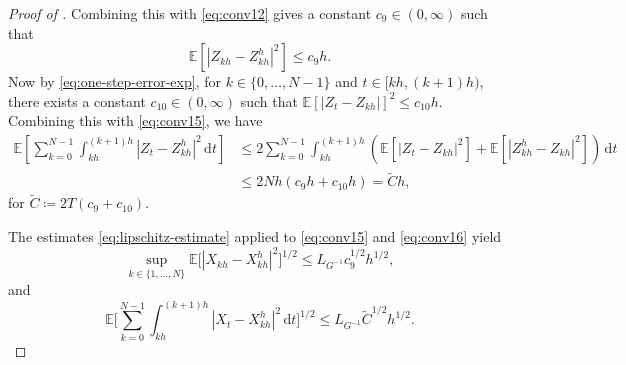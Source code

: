\documentclass[onseside, final]{amsart}
\theoremstyle{definition}
\newcommand{\E}{\mathbb E}
\newcommand{\D}{\,\mathrm{d}}
\numberwithin{equation}{section}
\begin{document}
\begin{proof}[Proof of ]
			Combining this with \eqref{eq:conv12} gives a constant $c_{9}\in(0,\infty)$ such that
			\begin{equation}\label{eq:conv15}
				\mathbb{E} [|Z_{kh}-Z^h_{kh}|^2]
				\le
				c_{9} h.
			\end{equation}
			Now by \eqref{eq:one-step-error-exp}, for $k \in \{0, \dotsc, N - 1\}$ and $t \in [kh, (k+1)h)$, there exists a constant $c_{10} \in (0, \infty)$ such that $\E[|Z_{t} - Z_{kh}|]^2 \leq c_{10}h$. Combining this with \eqref{eq:conv15}, we have
			\begin{equation}\label{eq:conv16}
				\begin{split}
					\E\!\left[\sum_{k = 0}^{N - 1} \int_{kh}^{(k+1)h}|Z_t - Z^h_{kh}|^2\D t\right]\! & \leq 2\sum_{k = 0}^{N - 1} \int_{kh}^{(k+1)h}\!\left(\E[|Z_t - Z_{kh}|^2] + \E[|Z^h_{kh} - Z_{kh}|^2]\right)\!\D t\\
					& \leq 2 N h (c_{9} h + c_{10} h) = \tilde C h,
				\end{split}
			\end{equation}
			for $\tilde C \coloneqq 2T(c_{9} + c_{10})$.
			
			The estimates \eqref{eq:lipschitz-estimate} applied to \eqref{eq:conv15} and \eqref{eq:conv16} yield
			\begin{equation}\label{eq:conv17}
				\sup_{k \in \{1, \dotsc, N\}}\mathbb{E}\bigl[|X_{kh}- X^h_{kh}|^{2}\bigr]^{1/2} \leq L_{G^{-1}} c_9^{1/2}h^{1/2},
			\end{equation}
			and
			\begin{equation}\label{eq:conv18}
				\E\Biggl[\sum_{k = 0}^{N - 1} \int_{kh}^{(k+1)h}|X_t - X^h_{kh}|^2\D t\Biggr]^{1/2} \leq L_{G^{-1}}\tilde C^{1/2} h^{1/2}.
			\end{equation}
			

\end{proof}
\end{document}
